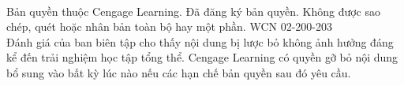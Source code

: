 \documentclass[10pt]{article}
\begin{document}
\vspace{0.45cm}

\noindent{\color{stewartcyan}\rule{\textwidth}{0.8pt}}\\[4pt]
{\centering\fontsize{6.5}{8.5}\selectfont\color{black!70}
Bản quyền thuộc Cengage Learning. Đã đăng ký bản quyền. Không được sao chép, quét hoặc nhân bản toàn bộ hay một phần. WCN 02-200-203\\[1pt]
Đánh giá của ban biên tập cho thấy nội dung bị lược bỏ không ảnh hưởng đáng kể đến trải nghiệm học tập tổng thể. Cengage Learning có quyền gỡ bỏ nội dung bổ sung vào bất kỳ lúc nào nếu các hạn chế bản quyền sau đó yêu cầu.\par}
\end{document}
